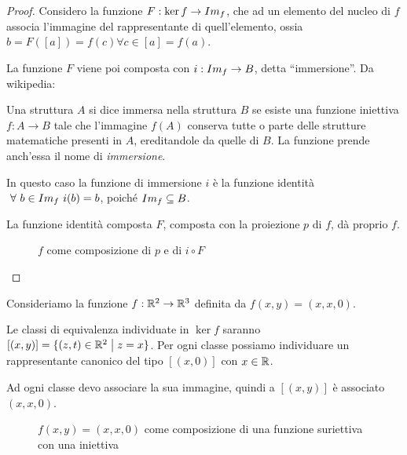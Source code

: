 \begin{proof}
Considero la funzione $F : \ker f \to Im_{f}$, che ad un elemento del nucleo di $f$ associa l'immagine del rappresentante di quell'elemento, ossia $b = F([a]) = f(c) \forall c \in [a] = f(a)$.

La funzione $F$ viene poi composta con $i : Im_{f} \to B $, detta ``immersione''. Da wikipedia:
\begin{defn}[Immersione]
Una struttura $A$  si dice immersa nella struttura $B$ se esiste una funzione iniettiva $f: A \to B$ tale che l'immagine $f(A)$ conserva tutte o parte delle strutture matematiche presenti in $A$, ereditandole da quelle di $B$. La funzione prende anch'essa il nome di \textit{immersione}.
\end{defn} 
In questo caso la funzione di immersione $i$ \`e la funzione identit\`a $ \forall b \in \image{f} \ i(b) = b$, poich\'e $Im_{f} \subseteq B$.

La funzione identit\`a composta $F$, composta con la proiezione $p$ di $f$, d\`a proprio $f$.

\begin{figure}[ht]
\centering
{}
\caption{$f$ come composizione di $p$ e di $i \circ F$}
\end{figure}
\end{proof}

\begin{exmp}
Consideriamo la funzione $f : \mathbb{R}^2 \to \mathbb{R}^3$ definita da $f(x,y) = (x,x,0)$.

Le classi di equivalenza individuate in $\ker f$ saranno $[(x,y)] = \{ (z,t) \in \mathbb{R}^2 \bigm| z = x\}$. Per ogni classe possiamo individuare un rappresentante canonico del tipo $[(x,0)]$ con $x \in \mathbb{R}$.

Ad ogni classe devo associare la sua immagine, quindi a $[(x,y)]$ \`e associato $(x,x,0)$.
\end{exmp}
\begin{figure}[ht]
\centering
{}
\caption{$f(x,y) = (x,x,0)$ come composizione di una funzione suriettiva con una iniettiva}
\end{figure}

